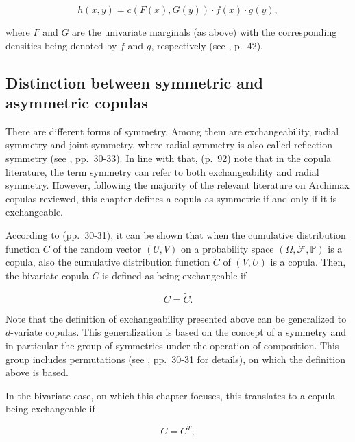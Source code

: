 \documentclass[
]{krantz}
\begin{document}
\begin{equation}
h(x, y)=c(F(x), G(y)) \cdot f(x) \cdot g(y),
\label{eq:sklardens}
\end{equation}

where \(F\) and \(G\) are the univariate marginals (as above) with the corresponding densities being denoted by \(f\) and \(g\), respectively (see \citet{durante2016}, p.~42).

\subsection{Distinction between symmetric and asymmetric copulas}\label{asymVsSym}

There are different forms of symmetry. Among them are exchangeability, radial symmetry and joint symmetry, where radial symmetry is also called reflection symmetry (see \citet{durante2016}, pp.~30-33). In line with that, \citet{genest2013} (p.~92) note that in the copula literature, the term symmetry can refer to both exchangeability and radial symmetry. However, following the majority of the relevant literature on Archimax copulas reviewed, this chapter defines a copula as symmetric if and only if it is exchangeable.

According to \citet{durante2016} (pp.~30-31), it can be shown that when the cumulative distribution function \(C\) of the random vector \((U,V)\) on a probability space \((\Omega, \mathcal{F}, \mathbb{P})\) is a copula, also the cumulative distribution function \(\tilde{C}\) of \((V,U)\) is a copula. Then, the bivariate copula \(C\) is defined as being exchangeable if

\begin{equation}
C=\tilde{C}.
\label{eq:defsymmgen}
\end{equation}

Note that the definition of exchangeability presented above can be generalized to \(d\)-variate copulas. This generalization is based on the concept of a symmetry and in particular the group of symmetries under the operation of composition. This group includes permutations (see \citet{durante2016}, pp.~30-31 for details), on which the definition above is based.

In the bivariate case, on which this chapter focuses, this translates to a copula being exchangeable if

\begin{equation}
C=C^T,
\label{eq:defsymm}
\end{equation}
\end{document}
